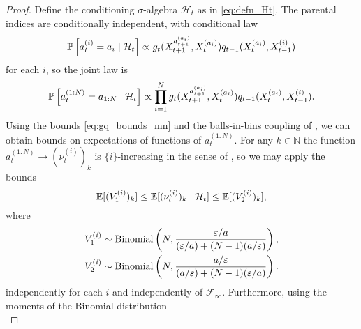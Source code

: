 \begin{proof}
Define the conditioning $\sigma$-algebra $\mathcal{H}_t$ as in \eqref{eq:defn_Ht}.
The parental indices are conditionally independent, with conditional law
\begin{equation}\label{eq:parentslaw_mn}
\mathbb{P} \left[ a_t^{(i)} = a_i \mid \mathcal{H}_t \right] 
\propto g_t( X_{t+1}^{a_{t+1}^{(a_i)}} , X_t^{(a_i)} ) q_{t-1}(X_t^{(a_i)}, X_{t-1}^{(i)})
\end{equation}
for each $i$, so the joint law is
\begin{equation*}
\mathbb{P} \left[ a_t^{(1:N)} = a_{1:N} \mid \mathcal{H}_t \right] 
\propto \prod_{i=1}^N g_t( X_{t+1}^{a_{t+1}^{(a_i)}} , X_t^{(a_i)} ) 
        q_{t-1}(X_t^{(a_i)}, X_{t-1}^{(i)}).
\end{equation*}
%
%
Using the bounds \eqref{eq:gq_bounds_mn} and the balls-in-bins coupling of \textcite[Proof of Lemma 3]{koskela2018}, we can obtain bounds on expectations of functions of $a_t^{(1:N)}$.
For any $k\in\mathbb{N}$ the function $a_t^{(1:N)} \to (\nu_t^{(i)})_k$ is $\{i\}$-increasing in the sense of \textcite{koskela2018}, so we may apply the bounds
\begin{equation*}
\mathbb{E}[ (V_1^{(i)})_k ]
\leq \mathbb{E}[ (\nu_t^{(i)})_k \mid \mathcal{H}_t ]
\leq \mathbb{E}[ (V_2^{(i)})_k ] ,
\end{equation*}
where
\begin{align*}
& V_1^{(i)} 
\sim \operatorname{Binomial}\left(N, \frac{\varepsilon/a}{(\varepsilon/a) + (N-1)(a/\varepsilon)} \right),\\
& V_2^{(i)} 
\sim \operatorname{Binomial}\left( N, \frac{a/\varepsilon}{(a/\varepsilon) + (N-1)(\varepsilon/a)} \right) .
\end{align*}
independently for each $i$ and independently of $\mathcal{F}_\infty$.
Furthermore, using the moments of the Binomial distribution \parencite[see for example][p. 67]{mosimann1962}
\begin{equation*}

\end{equation*}
\end{proof}
